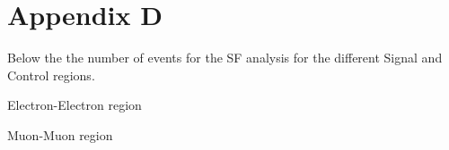 \section{Appendix D}\label{sec:AppD}

Below the the number of events for the SF analysis for the different Signal and Control regions.

Electron-Electron region


Muon-Muon region

